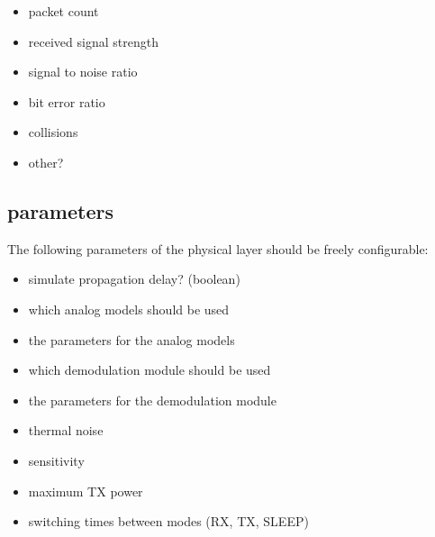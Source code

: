 \begin{itemize}
 \item packet count
 \item received signal strength
 \item signal to noise ratio
 \item bit error ratio
 \item collisions
 \item other?
\end{itemize}

\subsection{parameters}

The following parameters of the physical layer should be freely configurable:

\begin{itemize}
\item simulate propagation delay? (boolean)
\item which analog models should be used
\item the parameters for the analog models
\item which demodulation module should be used
\item the parameters for the demodulation module
\item thermal noise
\item sensitivity
\item maximum TX power
\item switching times between modes (RX, TX, SLEEP)
\end{itemize}
